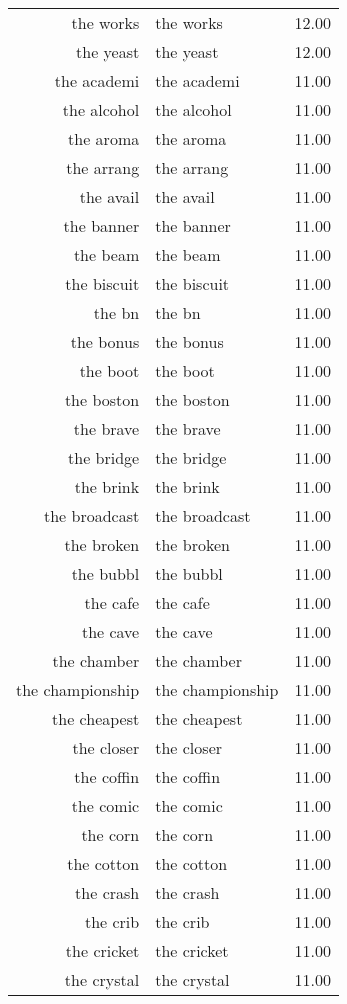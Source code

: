 \begin{table}[ht]
\begin{tabular}{rlr}
  the works & the works & 12.00 \\ 
  the yeast & the yeast & 12.00 \\ 
  the academi & the academi & 11.00 \\ 
  the alcohol & the alcohol & 11.00 \\ 
  the aroma & the aroma & 11.00 \\ 
  the arrang & the arrang & 11.00 \\ 
  the avail & the avail & 11.00 \\ 
  the banner & the banner & 11.00 \\ 
  the beam & the beam & 11.00 \\ 
  the biscuit & the biscuit & 11.00 \\ 
  the bn & the bn & 11.00 \\ 
  the bonus & the bonus & 11.00 \\ 
  the boot & the boot & 11.00 \\ 
  the boston & the boston & 11.00 \\ 
  the brave & the brave & 11.00 \\ 
  the bridge & the bridge & 11.00 \\ 
  the brink & the brink & 11.00 \\ 
  the broadcast & the broadcast & 11.00 \\ 
  the broken & the broken & 11.00 \\ 
  the bubbl & the bubbl & 11.00 \\ 
  the cafe & the cafe & 11.00 \\ 
  the cave & the cave & 11.00 \\ 
  the chamber & the chamber & 11.00 \\ 
  the championship & the championship & 11.00 \\ 
  the cheapest & the cheapest & 11.00 \\ 
  the closer & the closer & 11.00 \\ 
  the coffin & the coffin & 11.00 \\ 
  the comic & the comic & 11.00 \\ 
  the corn & the corn & 11.00 \\ 
  the cotton & the cotton & 11.00 \\ 
  the crash & the crash & 11.00 \\ 
  the crib & the crib & 11.00 \\ 
  the cricket & the cricket & 11.00 \\ 
  the crystal & the crystal & 11.00 \\ 

\end{tabular}
\end{table}

